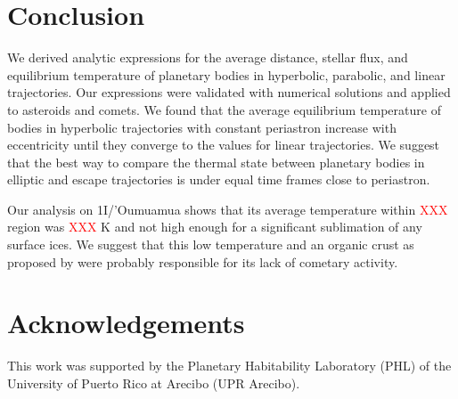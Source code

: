 \documentclass[a4paper,fleqn,usenatbib]{mnras}
\newcommand{\fix}{\textcolor{red}}
\begin{document}

\section{Conclusion}
\label{sec:conclusion}

We derived analytic expressions for the average distance, stellar flux, and equilibrium temperature of planetary bodies in hyperbolic, parabolic, and linear trajectories. Our expressions were validated with numerical solutions and applied to asteroids and comets. We found that the average equilibrium temperature of bodies in hyperbolic trajectories with constant periastron increase with eccentricity until they converge to the values for linear trajectories. We suggest that the best way to compare the thermal state between planetary bodies in elliptic and escape trajectories is under equal time frames close to periastron.

Our analysis on 1I/'Oumuamua shows that its average temperature within \fix{XXX} region was \fix{XXX} K and not high enough for a significant sublimation of any surface ices. We suggest that this low temperature and an organic crust as proposed by \citet{2017arXiv171206552F} were probably responsible for its lack of cometary activity.

\section*{Acknowledgements}

This work was supported by the Planetary Habitability Laboratory (PHL) of the University of Puerto Rico at Arecibo (UPR Arecibo).




%
\end{document}
